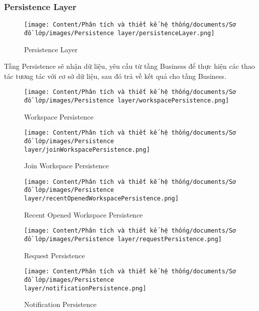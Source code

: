 \subsubsection{Persistence Layer}

\begin{figure}[H]
    \centering
    \texttt{[image: Content/Phân tích và thiết kế hệ thống/documents/Sơ đồ lớp/images/Persistence layer/persistenceLayer.png]}
    \vspace{0.5cm}
    \caption{Persistence Layer}
    \label{fig:enter-label}
\end{figure}
Tầng Persistence sẽ nhận dữ liệu, yêu cầu từ tầng Business để thực hiện các thao tác tương tác với cơ sở dữ liệu, sau đó trả về kết quả cho tầng Business.

\begin{figure}[H]
    \centering
    \texttt{[image: Content/Phân tích và thiết kế hệ thống/documents/Sơ đồ lớp/images/Persistence layer/workspacePersistence.png]}
    \vspace{0.5cm}
    \caption{Workspace Persistence}
    \label{fig:enter-label}
\end{figure}

\begin{figure}[H]
    \centering
    \texttt{[image: Content/Phân tích và thiết kế hệ thống/documents/Sơ đồ lớp/images/Persistence layer/joinWorkspacePersistence.png]}
    \vspace{0.5cm}
    \caption{Join Workspace Persistence}
    \label{fig:enter-label}
\end{figure}

\begin{figure}[H]
    \centering
    \texttt{[image: Content/Phân tích và thiết kế hệ thống/documents/Sơ đồ lớp/images/Persistence layer/recentOpenedWorkspacePersistence.png]}
    \vspace{0.5cm}
    \caption{Recent Opened Workspace Persistence}
    \label{fig:enter-label}
\end{figure}

\begin{figure}[H]
    \centering
    \texttt{[image: Content/Phân tích và thiết kế hệ thống/documents/Sơ đồ lớp/images/Persistence layer/requestPersistence.png]}
    \vspace{0.5cm}
    \caption{Request Persistence}
    \label{fig:enter-label}
\end{figure}

\begin{figure}[H]
    \centering
    \texttt{[image: Content/Phân tích và thiết kế hệ thống/documents/Sơ đồ lớp/images/Persistence layer/notificationPersistence.png]}
    \vspace{0.5cm}
    \caption{Notification Persistence}
    \label{fig:enter-label}
\end{figure}